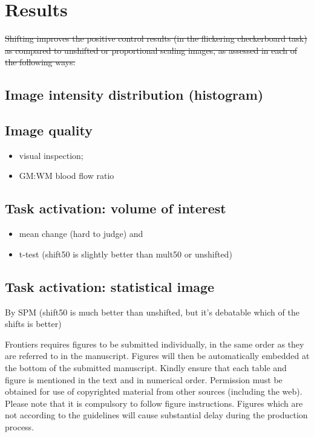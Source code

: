 \section{Results}

\sout{Shifting improves the positive control results (in the flickering checkerboard task) as compared to unshifted or proportional scaling images, as assessed in each of the following ways:}

\subsection{Image intensity distribution (histogram)}

\subsection{Image quality}
  \begin{itemize}
  \item visual inspection;
  \item GM:WM blood flow ratio
  \end{itemize}

\subsection{Task activation: volume of interest}
  \begin{itemize} 
    \item mean change (hard to judge) and 
    \item t-test (shift50 is slightly better than mult50 or unshifted)
  \end{itemize}

\subsection{Task activation: statistical image}
By SPM (shift50 is much better than unshifted, but it's debatable which of the shifts is better)


Frontiers requires figures to be submitted individually, in the same order as they are referred to in the manuscript. Figures will then be automatically embedded at the bottom of the submitted manuscript. Kindly ensure that each table and figure is mentioned in the text and in numerical order. Permission must be obtained for use of copyrighted material from other sources (including the web). Please note that it is compulsory to follow figure instructions. Figures which are not according to the guidelines will cause substantial delay during the production process.


